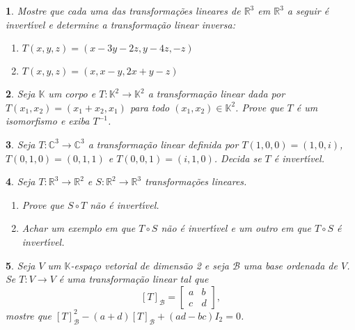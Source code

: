 \documentclass[12pt]{exam}
\newtheorem{exercicio}{}
\newcommand{\real}{\mathbb{R}}
\newcommand{\complex}{\mathbb{C}}
\newcommand{\cp}[1]{\mathbb{#1}}
\begin{document}
\begin{exercicio}
  Mostre que cada uma das transforma\c{c}\~oes lineares de $\real^3$ em $\real^3$ a seguir \'e invert{\'\i}vel e determine a transforma\c{c}\~ao linear inversa:
  \begin{enumerate}[label=({\alph*})]
    \item $T(x,y,z) = (x - 3y - 2z, y - 4z, -z)$
    \item $T(x,y,z) = (x, x - y, 2x + y -z)$
  \end{enumerate}
\end{exercicio}

\begin{exercicio}
  Seja $\cp{K}$ um corpo e $T : \cp{K}^2 \to \cp{K}^2$ a transforma\c{c}\~ao linear dada por $T(x_1,x_2) = (x_1 + x_2, x_1)$ para todo $(x_1,x_2) \in \cp{K}^2$. Prove que $T$ \'e um isomorfismo e exiba $T^{-1}$.
\end{exercicio}

\begin{exercicio}
  Seja $T : \complex^3 \to \complex^3$ a transforma\c{c}\~ao linear definida por $T(1,0,0) = (1,0,i)$, $T(0,1,0) = (0,1,1)$ e $T(0,0,1) = (i,1,0)$. Decida se $T$ \'e invert{\'\i}vel.
\end{exercicio}

\begin{exercicio}
  Seja $T : \real^3 \to \real^2$ e $S : \real^2 \to \real^3$ transforma\c{c}\~oes lineares.
  \begin{enumerate}[label=({\alph*})]
    \item Prove que $S \circ T$ n\~ao \'e invert{\'\i}vel.
    \item Achar um exemplo em que $T\circ S$ n\~ao \'e invert{\'\i}vel e um outro em que $T\circ S$ \'e invert{\'\i}vel.
  \end{enumerate}
\end{exercicio}

\begin{exercicio}
  Seja $V$ um $\cp{K}$-espa\c{c}o vetorial de dimens\~ao 2 e seja $\mathcal{B}$ uma base ordenada de $V$. Se $T: V \to V$ \'e uma transforma\c{c}\~ao linear tal que
  \[
    [T]_\mathcal{B} = \begin{bmatrix}
      a & b\\
      c & d
    \end{bmatrix},
  \]
  mostre que $[T]_\mathcal{B}^2 - (a + d)[T]_\mathcal{B} + (ad - bc)I_2 = 0$.
\end{exercicio}
\end{document}
